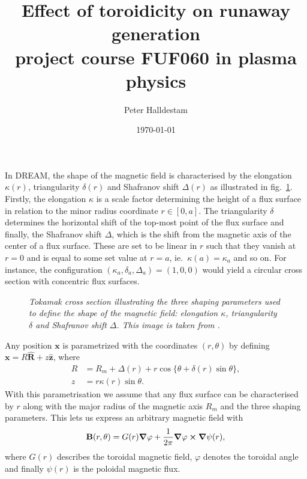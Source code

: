 \documentclass[11pt,a4paper]{article}
\title{Effect of toroidicity on runaway generation\\\vspace{.3cm} \large{project course FUF060 in plasma physics}}
\author{Peter Halldestam}
\date{\today}
\renewcommand{\vec}[1]{\boldsymbol{\mathbf{#1}}}
\begin{document}
\maketitle

\noindent
In \textsc{DREAM}, the shape of the magnetic field is characterised by the elongation $\kappa(r)$, triangularity $\delta(r)$ and Shafranov shift $\Delta(r)$ as illustrated in fig.\ \ref{fig:toroidicity}.
Firstly, the elongation $\kappa$ is a scale factor determining the height of a flux surface in relation to the minor radius coordinate $r\in[0, a]$.
The triangularity $\delta$ determines the horizontal shift of the top-most point of the flux surface and finally, the Shafranov shift $\Delta$, which is the shift from the magnetic axis of the center of a flux surface.
These are set to be linear in $r$ such that they vanish at $r=0$ and is equal to some set value at $r=a$, ie.\ $\kappa(a)=\kappa_a$ and so on.
For instance, the configuration $(\kappa_a, \delta_a, \Delta_a)=(1, 0, 0)$ would yield a circular cross section with concentric flux surfaces.

\begin{figure}[H]
  \begin{minipage}[l]{0.6\textwidth}
    
  \end{minipage}
  \hfill
  \begin{minipage}[c]{0.4\textwidth}
      \caption{\textit{Tokamak cross section illustrating the three shaping parameters used to define the shape of the magnetic field: elongation $\kappa$, triangularity $\delta$ and Shafranov shift $\Delta$.
      This image is taken from \cite{DREAM}.}}
      \label{fig:toroidicity}
  \end{minipage}
\end{figure}

\noindent
Any position $\vec{x}$ is parametrized with the coordinates $(r, \theta)$ by defining $\vec{x}=R\vec{\hat{R}}+z\vec{\hat{z}}$, where
\begin{align*}
    R
    &=R_m+\Delta(r)+r\cos\{\theta+\delta(r)\sin\theta\},\\
    z
    &=r\kappa(r)\sin\theta.
\end{align*}
With this parametrisation we assume that any flux surface can be characterised by $r$ along with the major radius of the magnetic axis $R_m$ and the three shaping parameters.
This lets us express an arbitrary magnetic field with
\begin{align}
    \label{eq:magnetic}
    \vec{B}(r, \theta)
    =G(r)\grad{\varphi}+\frac{1}{2\pi}\grad{\varphi}\cross\grad{\psi(r)},
\end{align}
where $G(r)$ describes the toroidal magnetic field, $\varphi$ denotes the toroidal angle and finally $\psi(r)$ is the poloidal magnetic flux.
\end{document}
